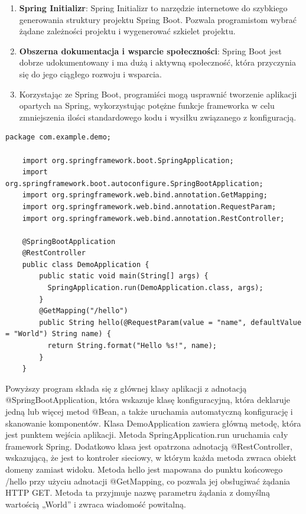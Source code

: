 \begin{enumerate}
    \item \textbf{Spring Initializr}: Spring Initializr to narzędzie internetowe do szybkiego generowania struktury projektu Spring Boot. Pozwala programistom wybrać żądane zależności projektu i wygenerować szkielet projektu\cite{springbootFeatures}.
    \item \textbf{Obszerna dokumentacja i wsparcie społeczności}: Spring Boot jest dobrze udokumentowany i ma dużą i aktywną społeczność, która przyczynia się do jego ciągłego rozwoju i wsparcia\cite{springbootFeatures}.
    \item Korzystając ze Spring Boot, programiści mogą usprawnić tworzenie aplikacji opartych na Spring, wykorzystując potężne funkcje frameworka w celu zmniejszenia ilości standardowego kodu i wysiłku związanego z konfiguracją\cite{springbootFeatures}.
\end{enumerate}

\begin{lstlisting}[caption=Przykładowy podstawowy program , label=basicSpringBootClass]
    package com.example.demo;
    
    import org.springframework.boot.SpringApplication;
    import org.springframework.boot.autoconfigure.SpringBootApplication;
    import org.springframework.web.bind.annotation.GetMapping;
    import org.springframework.web.bind.annotation.RequestParam;
    import org.springframework.web.bind.annotation.RestController;
    
    @SpringBootApplication
    @RestController
    public class DemoApplication {
        public static void main(String[] args) {
          SpringApplication.run(DemoApplication.class, args);
        }
        @GetMapping("/hello")
        public String hello(@RequestParam(value = "name", defaultValue = "World") String name) {
          return String.format("Hello %s!", name);
        }
    }
\end{lstlisting}

Powyższy program składa się z głównej klasy aplikacji z adnotacją @SpringBootApplication, która wskazuje klasę konfiguracyjną, która deklaruje jedną lub więcej metod @Bean, a także uruchamia automatyczną konfigurację i skanowanie komponentów. Klasa DemoApplication zawiera główną metodę, która jest punktem wejścia aplikacji. Metoda SpringApplication.run uruchamia cały framework Spring.
Dodatkowo klasa jest opatrzona adnotacją @RestController, wskazującą, że jest to kontroler sieciowy, w którym każda metoda zwraca obiekt domeny zamiast widoku. Metoda hello jest mapowana do punktu końcowego /hello przy użyciu adnotacji @GetMapping, co pozwala jej obsługiwać żądania HTTP GET. Metoda ta przyjmuje nazwę parametru żądania z domyślną wartością „World” i zwraca wiadomość powitalną.

